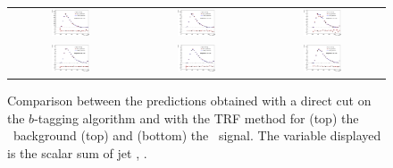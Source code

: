 \begin{figure}[!t]
\begin{center}
  \begin{tabular}{@{}c@{}c@{}c@{}}
\includegraphics[width=0.33\textwidth]{Modeling/Figures/plots_trf/tt_6jetin_2btagex_HTj} &
\includegraphics[width=0.33\textwidth]{Modeling/Figures/plots_trf/tt_6jetin_3btagex_HTj} & %
\includegraphics[width=0.33\textwidth]{Modeling/Figures/plots_trf/tt_6jetin_4btagin_HTj} \\  
\includegraphics[width=0.33\textwidth]{Modeling/Figures/plots_trf/ttH125_6jetin_2btagex_HTj} &
\includegraphics[width=0.33\textwidth]{Modeling/Figures/plots_trf/ttH125_6jetin_3btagex_HTj} & %
\includegraphics[width=0.33\textwidth]{Modeling/Figures/plots_trf/ttH125_6jetin_4btagin_HTj} \\  
\end{tabular}
\end{center}
\caption{
Comparison between the predictions obtained with a direct cut on the $b$-tagging algorithm and with the TRF method for (top) the \ttbar\ background (top) and (bottom) the \ttH\ signal. The variable displayed is the scalar sum of jet \pt, \hthad. }
\label{fig:TRFclos_ttbar}
\end{figure}

